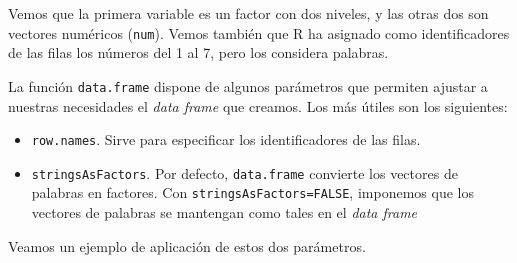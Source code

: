\documentclass[
]{book}
\newenvironment{Shaded}{\begin{snugshade}}{\end{snugshade}}
\newcommand{\CommentTok}[1]{\textcolor[rgb]{0.56,0.35,0.01}{\textit{#1}}}
\newcommand{\DataTypeTok}[1]{\textcolor[rgb]{0.13,0.29,0.53}{#1}}
\newcommand{\KeywordTok}[1]{\textcolor[rgb]{0.13,0.29,0.53}{\textbf{#1}}}
\newcommand{\NormalTok}[1]{#1}
\newcommand{\OperatorTok}[1]{\textcolor[rgb]{0.81,0.36,0.00}{\textbf{#1}}}
\newcommand{\OtherTok}[1]{\textcolor[rgb]{0.56,0.35,0.01}{#1}}
\newcommand{\StringTok}[1]{\textcolor[rgb]{0.31,0.60,0.02}{#1}}
\theoremstyle{definition}
\theoremstyle{definition}
\theoremstyle{definition}
\theoremstyle{remark}
\begin{document}
Vemos que la primera variable es un factor con dos niveles, y las otras dos son vectores numéricos (\texttt{num}). Vemos también que R ha asignado como identificadores de las filas los números del 1 al 7, pero los considera palabras.

La función \texttt{data.frame} dispone de algunos parámetros que permiten ajustar a nuestras necesidades el \emph{data frame} que creamos. Los más útiles son los siguientes:

\begin{itemize}
\item
  \texttt{row.names}. Sirve para especificar los identificadores de las filas.
\item
  \texttt{stringsAsFactors}. Por defecto, \texttt{data.frame} convierte los vectores de palabras en factores. Con \texttt{stringsAsFactors=FALSE}, imponemos que los vectores de palabras se mantengan como tales en el \emph{data frame}
\end{itemize}

Veamos un ejemplo de aplicación de estos dos parámetros.

\begin{Shaded}
\end{Shaded}
\end{document}
